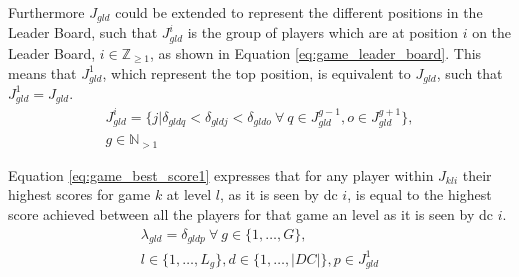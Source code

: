Furthermore $J_{gld}$ could be extended to represent the different positions in the Leader Board, such that $J^{i}_{gld}$ is the group of players which are at position $i$ on the Leader Board, $i \in \mathbb{Z}_{\ge 1}$, as shown in Equation \ref{eq:game_leader_board}. This means that $J^{1}_{gld}$, which represent the top position, is equivalent to $J_{gld}$, such that $J^{1}_{gld} = J_{gld}$.
\begin{multline} \label{eq:game_leader_board}
	J^{i}_{gld} = \{j | \delta_{gldq} < \delta_{gldj} < \delta_{gldo} ~ \forall ~ q \in J^{g-1}_{gld}, o \in J^{g+1}_{gld}\},\\ g \in \mathbb{N}_{> 1}
\end{multline}

Equation \ref{eq:game_best_score1} expresses that for any player within $J_{kli}$ their highest scores for game $k$ at level $l$, as it is seen by \gls{dc} $i$, is equal to the highest score achieved between all the players for that game an level as it is seen by \gls{dc} $i$.
\begin{multline} \label{eq:game_best_score1}
	\lambda_{gld} = \delta_{gldp} ~ \forall ~ g \in \{1,\dots, G\},\\ l \in \{1,\dots, L_{g}\}, d \in \{1,\dots, |DC|\}, p \in J^{1}_{gld}
\end{multline}
